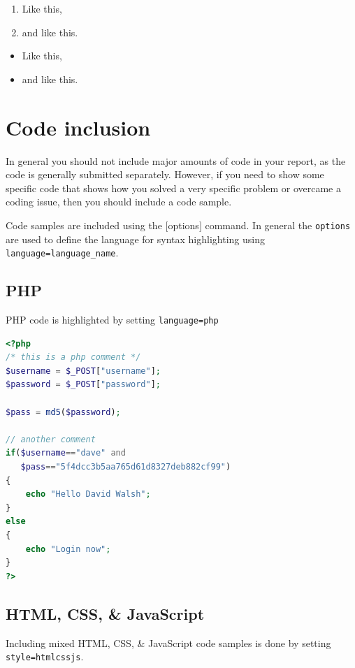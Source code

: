 \documentclass[a4paper,10pt]{ehu_webdev_report}
\begin{document}
\begin{enumerate}
  \item Like this,
  \item and like this.
\end{enumerate}

\begin{itemize}
  \item Like this,
  \item and like this.
\end{itemize}

\section{Code inclusion}

In general you should not include major amounts of code in your report, as the code is generally submitted separately. However, if you need to show some specific code that shows how you solved a very specific problem or overcame a coding issue, then you should include a code sample.

Code samples are included using the $[$options$]$ command. In general the \texttt{options} are used to define the language for syntax highlighting using \texttt{language=language\_name}.

\subsection{PHP}

PHP code is highlighted by setting \texttt{language=php}

\begin{lstlisting}[language=php]
<?php
/* this is a php comment */
$username = $_POST["username"];
$password = $_POST["password"];

$pass = md5($password);

// another comment
if($username=="dave" and
   $pass=="5f4dcc3b5aa765d61d8327deb882cf99")
{
    echo "Hello David Walsh";
}
else
{
    echo "Login now";
}
?>
\end{lstlisting}

\subsection{HTML, CSS, \& JavaScript}

Including mixed HTML, CSS, \& JavaScript code samples is done by setting \texttt{style=htmlcssjs}.
\end{document}
